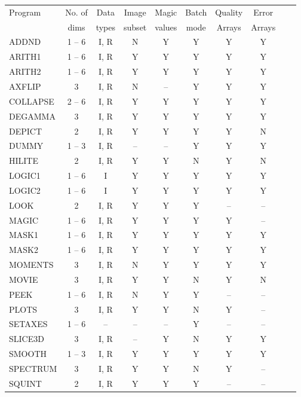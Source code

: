 {\small
\begin{table}[htb]
\begin{center}                
\begin{tabular}{|l|c|c|c|c|c|c|c|c|c|} \hline                                  
Program & No. of & Data  & Image  & Magic  & Batch & Quality & Error \\
        & dims   & types & subset & values & mode  & Arrays & Arrays\\
\hline
ADDND     & 1 -- 6 & I, R & N & Y & Y & Y & Y\\
ARITH1    & 1 -- 6 & I, R & Y & Y & Y & Y & Y\\
ARITH2    & 1 -- 6 & I, R & Y & Y & Y & Y & Y\\
AXFLIP    & 3      & I, R & N & -- & Y & Y & Y\\
COLLAPSE  & 2 -- 6 & I, R & Y & Y & Y & Y & Y\\
DEGAMMA   & 3      & I, R & Y & Y & Y & Y & Y\\
DEPICT    & 2      & I, R & Y & Y & Y & Y & N\\
DUMMY     & 1 -- 3 & I, R & -- & -- & Y & Y & Y\\
HILITE    & 2      & I, R & Y & Y & N & Y & N\\
LOGIC1    & 1 -- 6 & I    & Y & Y & Y & Y & Y\\
LOGIC2    & 1 -- 6 & I    & Y & Y & Y & Y & Y\\
LOOK      & 2      & I, R & Y & Y & Y & -- & --\\
MAGIC     & 1 -- 6 & I, R & Y & Y & Y & Y & --\\
MASK1     & 1 -- 6 & I, R & Y & Y & Y & Y & Y\\
MASK2     & 1 -- 6 & I, R & Y & Y & Y & Y & Y\\
MOMENTS   & 3      & I, R & N & Y & Y & Y & Y\\
MOVIE     & 3      & I, R & Y & Y & N & Y & N\\
PEEK      & 1 -- 6 & I, R & N & Y & Y & -- & --\\
PLOTS     & 3      & I, R & Y & Y & N & Y & --\\
SETAXES   & 1 -- 6 & --   & -- & -- & Y & -- & --\\
SLICE3D   & 3      & I, R & -- & Y & N & Y & Y\\
SMOOTH    & 1 -- 3 & I, R & Y & Y & Y & Y & Y\\
SPECTRUM  & 3      & I, R & Y & Y & N & Y & --\\
SQUINT    & 2      & I, R & Y & Y & Y & -- & --\\

\end{tabular}
\end{center}
\end{table}}
